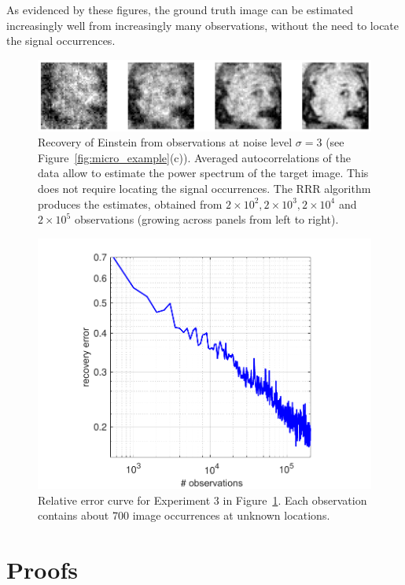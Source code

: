 \documentclass[12pt]{article}
\newcommand{\1}{\mathbf{1}}
\theoremstyle{plain}
\theoremstyle{definition}
\theoremstyle{remark}
\theoremstyle{plain}
\theoremstyle{remark}
\theoremstyle{plain}
\theoremstyle{plain}
\theoremstyle{plain}
\numberwithin{equation}{section}
\begin{document}
As evidenced by these figures, the ground truth image can be estimated increasingly well from increasingly many observations, without the need to locate the signal occurrences.



\begin{figure}[t]
	\centering
	\includegraphics[width=1\linewidth]{Einstien_progress_examples}
	\caption{\label{fig:Einst_example} Recovery of Einstein from observations at noise level $\sigma = 3$ (see Figure~\ref{fig:micro_example}(c)). Averaged autocorrelations of the data allow to estimate the power spectrum of the target image. This does not require locating the signal occurrences. The RRR algorithm produces the estimates,  obtained from $2\times 10^2,2\times 10^3,2\times 10^4$ and $2\times 10^5$ observations (growing across panels from left to right).}	
\end{figure}


\begin{figure}[h]
	\centering
	\includegraphics[width=.8\linewidth]{Einstein_recovery_error}
	\caption{\label{fig:error_per_micro}Relative error curve for Experiment 3 in Figure~\ref{fig:Einst_example}. Each observation contains about 700 image occurrences at unknown locations.}
\end{figure}

\section{Proofs}
\end{document}
